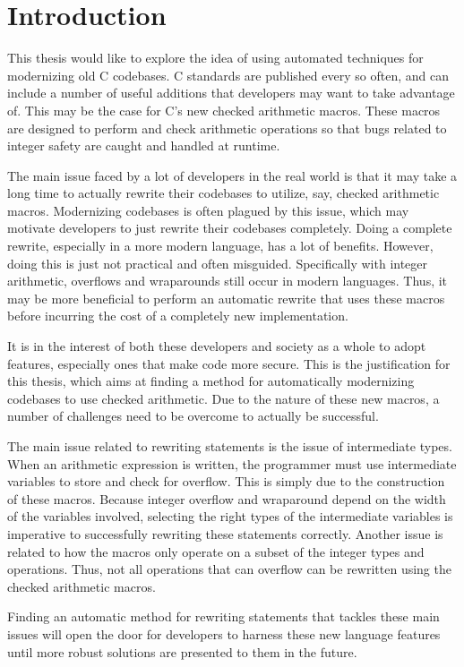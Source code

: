 \chapter{Introduction}
\label{sec:intro}

This thesis would like to explore the idea of using automated techniques for modernizing old C codebases. C standards are published every so often, and can include a number of useful additions that developers may want to take advantage of. This may be the case for C's new checked arithmetic macros. These macros are designed to perform and check arithmetic operations so that bugs related to integer safety are caught and handled at runtime.

The main issue faced by a lot of developers in the real world is that it may take a long time to actually rewrite their codebases to utilize, say, checked arithmetic macros. Modernizing codebases is often plagued by this issue, which may motivate developers to just rewrite their codebases completely. Doing a complete rewrite, especially in a more modern language, has a lot of benefits. However, doing this is just not practical and often misguided. Specifically with integer arithmetic, overflows and wraparounds still occur in modern languages. Thus, it may be more beneficial to perform an automatic rewrite that uses these macros before incurring the cost of a completely new implementation.

It is in the interest of both these developers and society as a whole to adopt features, especially ones that make code more secure. This is the justification for this thesis, which aims at finding a method for automatically modernizing codebases to use checked arithmetic. Due to the nature of these new macros, a number of challenges need to be overcome to actually be successful.

The main issue related to rewriting statements is the issue of intermediate types. When an arithmetic expression is written, the programmer must use intermediate variables to store and check for overflow. This is simply due to the construction of these macros. Because integer overflow and wraparound depend on the width of the variables involved, selecting the right types of the intermediate variables is imperative to successfully rewriting these statements correctly. Another issue is related to how the macros only operate on a subset of the integer types and operations. Thus, not all operations that can overflow can be rewritten using the checked arithmetic macros.

Finding an automatic method for rewriting statements that tackles these main issues will open the door for developers to harness these new language features until more robust solutions are presented to them in the future.